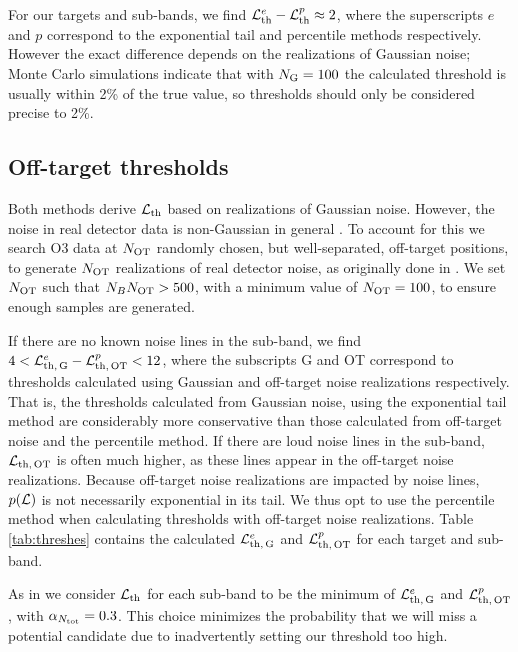 \begin{subappendices}
For our targets and sub-bands, we find $\mathcal{L}_{\rm th}^e - \mathcal{L}_{\rm th}^p \approx 2$, where the superscripts $e$ and $p$ correspond to the exponential tail and percentile methods respectively. However the exact difference depends on the realizations of Gaussian noise; Monte Carlo simulations indicate that with $N_{\rm G} = 100$ the calculated threshold is usually within 2\% of the true value, so thresholds should only be considered precise to 2\%. 

\subsection{Off-target thresholds \label{app:amxp_offt_th}}
Both methods derive $\mathcal{L}_{\rm th}$ based on realizations of Gaussian noise. However, the noise in real detector data is non-Gaussian in general \cite{o23DetChar}. To account for this we search O3 data at $N_{\rm OT}$ randomly chosen, but well-separated, off-target positions, to generate $N_{\rm OT}$ realizations of real detector noise, as originally done in \citet{Middleton2020}. We set $N_{\rm OT}$ such that $N_B N_{\rm OT} > 500$, with a minimum value of $N_{\rm OT}=100$, to ensure enough samples are generated.

If there are no known noise lines in the sub-band, we find $4 < \mathcal{L}_{\rm th,\,G}^e - \mathcal{L}_{\rm th,\,OT}^p < 12$, where the subscripts G and OT correspond to thresholds calculated using Gaussian and off-target noise realizations respectively. That is, the thresholds calculated from Gaussian noise, using the exponential tail method are considerably more conservative than those calculated from off-target noise and the percentile method. If there are loud noise lines in the sub-band, $\mathcal{L}_{\rm th,\,OT}$ is often much higher, as these lines appear in the off-target noise realizations. Because off-target noise realizations are impacted by noise lines, $p(\mathcal{L})$ is not necessarily exponential in its tail. We thus opt to use the percentile method when calculating thresholds with off-target noise realizations. Table \ref{tab:threshes} contains the calculated $\mathcal{L}_{\rm th,\,G}^e$ and $\mathcal{L}_{\rm th,\,OT}^p$ for each target and sub-band.

As in \citet{Middleton2020} we consider $\mathcal{L}_{\rm th}$ for each sub-band to be the minimum of $\mathcal{L}_{\rm th,\,G}^e$ and $\mathcal{L}_{\rm th,\,OT}^p$, with $\alpha_{N_{\rm tot}}=0.3$. This choice minimizes the probability that we will miss a potential candidate due to inadvertently setting our threshold too high. 


\end{subappendices}
